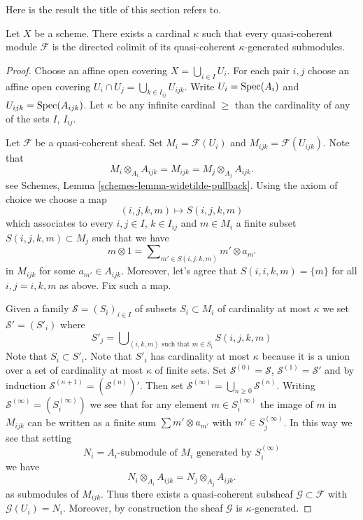\noindent
Here is the result the title of this section refers to.

\begin{lemma}
\label{lemma-colimit-kappa}
Let $X$ be a scheme. There exists a cardinal $\kappa$ such that
every quasi-coherent module $\mathcal{F}$ is the directed colimit
of its quasi-coherent $\kappa$-generated submodules.
\end{lemma}

\begin{proof}
Choose an affine open covering $X = \bigcup_{i \in I} U_i$. For each pair
$i, j$ choose an affine open covering
$U_i \cap U_j = \bigcup_{k \in I_{ij}} U_{ijk}$.
Write $U_i = \mathop{\mathrm{Spec}}(A_i)$ and $U_{ijk} = \mathop{\mathrm{Spec}}(A_{ijk})$.
Let $\kappa$ be any infinite cardinal $\geq$ than the cardinality
of any of the sets $I$, $I_{ij}$.

\medskip\noindent
Let $\mathcal{F}$ be a quasi-coherent sheaf. Set $M_i = \mathcal{F}(U_i)$
and $M_{ijk} = \mathcal{F}(U_{ijk})$. Note that
$$
M_i \otimes_{A_i} A_{ijk} = M_{ijk} = M_j \otimes_{A_j} A_{ijk}.
$$
see
Schemes, Lemma \ref{schemes-lemma-widetilde-pullback}.
Using the axiom of choice we choose a map
$$
(i, j, k, m) \mapsto S(i, j, k, m)
$$
which associates to every $i, j \in I$, $k \in I_{ij}$ and $m \in M_i$
a finite subset $S(i, j, k, m) \subset M_j$ such that we have
$$
m \otimes 1 = \sum\nolimits_{m' \in S(i, j, k, m)} m' \otimes a_{m'}
$$
in $M_{ijk}$ for some $a_{m'} \in A_{ijk}$. Moreover, let's agree
that $S(i, i, k, m) = \{m\}$ for all $i, j = i, k, m$ as above.
Fix such a map.

\medskip\noindent
Given a family $\mathcal{S} = (S_i)_{i \in I}$ of subsets
$S_i \subset M_i$ of cardinality at most $\kappa$ we set
$\mathcal{S}' = (S'_i)$ where
$$
S'_j = \bigcup\nolimits_{(i, k, m)\text{ such that }m \in S_i}
S(i, j, k, m)
$$
Note that $S_i \subset S'_i$. Note that $S'_i$ has cardinality at most
$\kappa$ because it is a union over a set of cardinality at most $\kappa$
of finite sets. Set $\mathcal{S}^{(0)} = \mathcal{S}$,
$\mathcal{S}^{(1)} = \mathcal{S}'$ and by induction
$\mathcal{S}^{(n + 1)} = (\mathcal{S}^{(n)})'$. Then set
$\mathcal{S}^{(\infty)} = \bigcup_{n \geq 0} \mathcal{S}^{(n)}$.
Writing $\mathcal{S}^{(\infty)} = (S^{(\infty)}_i)$ we see that
for any element $m \in S^{(\infty)}_i$ the image of $m$ in
$M_{ijk}$ can be written as a finite sum $\sum m' \otimes a_{m'}$
with $m' \in S_j^{(\infty)}$. In this way we see that setting
$$
N_i = A_i\text{-submodule of }M_i\text{ generated by }S^{(\infty)}_i
$$
we have
$$
N_i \otimes_{A_i} A_{ijk} = N_j \otimes_{A_j} A_{ijk}.
$$
as submodules of $M_{ijk}$. Thus there exists a quasi-coherent subsheaf
$\mathcal{G} \subset \mathcal{F}$ with $\mathcal{G}(U_i) = N_i$.
Moreover, by construction the sheaf $\mathcal{G}$ is $\kappa$-generated.


\end{proof}
